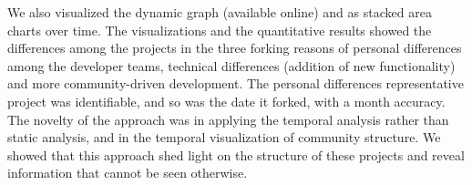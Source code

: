 \documentclass[ifip]{svmult}
\begin{document}
We also visualized the dynamic graph (available online) and as stacked area charts over time. The visualizations and the quantitative results showed the differences among the projects in the three forking reasons of personal differences among the developer teams, technical differences (addition of new functionality) and more community-driven development. The personal differences representative project was identifiable, and so was the date it forked, with a month accuracy. The novelty of the approach was in applying the temporal analysis rather than static analysis, and in the temporal visualization of community structure. We showed that this approach shed light on the structure of these projects and reveal information that cannot be seen otherwise.

\end{document}

